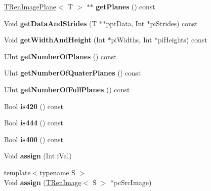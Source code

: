 \begin{DoxyCompactItemize}
\mbox{\label{class_t_ren_image_ad24a342cfc2c70698d57a0bbda64d65b}} 
\hyperlink{class_t_ren_image_plane}{T\+Ren\+Image\+Plane}$<$ T $>$ $\ast$$\ast$ {\bfseries get\+Planes} () const
\item 
\mbox{\label{class_t_ren_image_adefd016342b471fda0f4451cf365358d}} 
Void {\bfseries get\+Data\+And\+Strides} (T $\ast$$\ast$ppt\+Data, Int $\ast$pi\+Strides) const
\item 
\mbox{\label{class_t_ren_image_a5e028f609c350022c50aa73e7dfa5e39}} 
Void {\bfseries get\+Width\+And\+Height} (Int $\ast$pi\+Widths, Int $\ast$pi\+Heights) const
\item 
\mbox{\label{class_t_ren_image_ae03b15d1b0334e8b7fd0b45f6c35e576}} 
U\+Int {\bfseries get\+Number\+Of\+Planes} () const
\item 
\mbox{\label{class_t_ren_image_af7afd8c77942c6794ec41a2edae7148b}} 
U\+Int {\bfseries get\+Number\+Of\+Quater\+Planes} () const
\item 
\mbox{\label{class_t_ren_image_a6c6b986395df3baa8bb656b14665b4f2}} 
U\+Int {\bfseries get\+Number\+Of\+Full\+Planes} () const
\item 
\mbox{\label{class_t_ren_image_ab8d3a19c8ac4c608fed5f4729fe51792}} 
Bool {\bfseries is420} () const
\item 
\mbox{\label{class_t_ren_image_ac471694c3db5492500e9a9738e13f9f8}} 
Bool {\bfseries is444} () const
\item 
\mbox{\label{class_t_ren_image_a83a31ea8f3a41bf1db1ed86d74498416}} 
Bool {\bfseries is400} () const
\item 
\mbox{\label{class_t_ren_image_ab27a93b9d91bd0f832d80bae94058279}} 
Void {\bfseries assign} (Int i\+Val)
\item 
\mbox{\label{class_t_ren_image_a40d48086594236c9bd25fabbd8895c9f}} 
{\footnotesize template$<$typename S $>$ }\\Void {\bfseries assign} (\hyperlink{class_t_ren_image}{T\+Ren\+Image}$<$ S $>$ $\ast$pc\+Src\+Image)

\end{DoxyCompactItemize}
